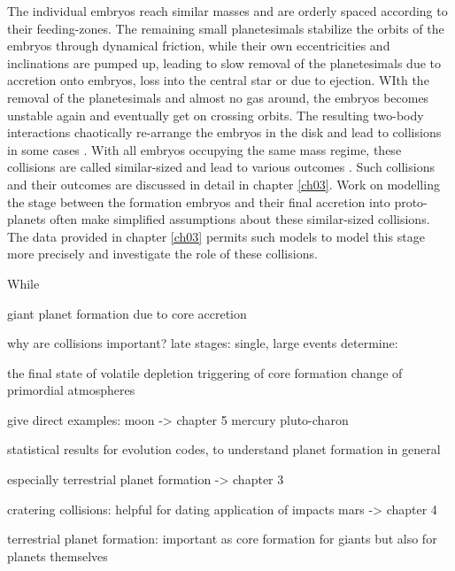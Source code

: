 The individual embryos reach similar masses and are orderly spaced according to their feeding-zones. The remaining small planetesimals stabilize the orbits of the embryos through dynamical friction, while their own eccentricities and inclinations are pumped up, leading to slow removal of the planetesimals due to accretion onto embryos, loss into the central star or due to ejection. WIth the removal of the planetesimals and almost no gas around, the embryos becomes unstable again and eventually get on crossing orbits. The resulting two-body interactions chaotically re-arrange the embryos in the disk and lead to collisions in some cases \cite{Chambers:2001p2105, Chambers:2004p4098}. With all embryos occupying the same mass regime, these collisions are called similar-sized and lead to various outcomes \cite{Asphaug:2010p3539}. Such collisions and their outcomes are discussed in detail in chapter \ref{ch03}. Work on modelling the stage between the formation embryos and their final accretion into proto-planets often make simplified assumptions about these similar-sized collisions. The data provided in chapter \ref{ch03} permits such models to model this stage more precisely and investigate the role of these collisions.

While 

giant planet formation due to core accretion \citep{1996Icar..124...62P} 

why are collisions important?
late stages: single, large events determine:

the final state of volatile depletion \citep{2001E&PSL.192..545H}
triggering of core formation \cite{1992Icar..100..326T}
change of primordial atmospheres \cite{2002DPS....34.2804A}

give direct examples:
moon -> chapter 5 \cite{Canup:2001p1861} \cite{1987Icar...71...30B} \cite{1975Icar...24..504H} \cite{1976LPI.....7..120C}
mercury \cite{Benz:1988p3336}
pluto-charon \cite{Canup:2005p1987}

statistical results for evolution codes, to understand planet formation in general 

especially terrestrial planet formation \cite{2006Icar..184...39O} 
\cite{Lisse:2009p3131} -> chapter 3

cratering collisions: helpful for dating 
application of impacts mars -> chapter 4




\cite{Chambers:2004p4098}

terrestrial planet formation: important as core formation for giants but also for planets themselves


